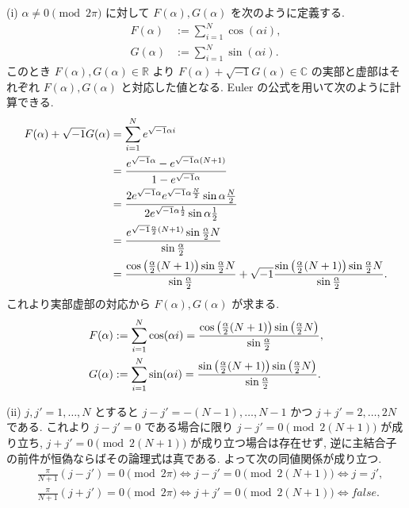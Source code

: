 \documentclass[uplatex,dvipdfmx,a4paper,11pt]{jlreq}
\theoremstyle{definition}
\newcommand{\RR}{\mathbb{R}}
\newcommand{\CC}{\mathbb{C}}
\begin{document}
(i) $\alpha \neq 0 \pmod{2\pi}$ に対して $F(\alpha), G(\alpha)$ を次のように定義する.
\begin{align}
  F(\alpha) & := \sum_{i=1}^{N}\cos(\alpha i), \\
  G(\alpha) & := \sum_{i=1}^{N}\sin(\alpha i).
\end{align}
このとき $F(\alpha), G(\alpha)\in\RR$ より $F(\alpha) + \sqrt{-1}G(\alpha)\in\CC$ の実部と虚部はそれぞれ $F(\alpha), G(\alpha)$ と対応した値となる. Euler の公式を用いて次のように計算できる.
\begin{align}
  F(\alpha) + \sqrt{-1}G(\alpha) & = \sum_{i=1}^{N}e^{\sqrt{-1}\alpha i}                                                                                                                                                     \\
                                 & = \frac{e^{\sqrt{-1}\alpha} - e^{\sqrt{-1}\alpha (N+1)}}{1 - e^{\sqrt{-1}\alpha}}                                                                                                         \\
                                 & = \frac{2e^{\sqrt{-1}\alpha}e^{\sqrt{-1}\alpha \frac{N}{2}}\sin{\alpha \frac{N}{2}}}{2e^{\sqrt{-1}\alpha\frac{1}{2}}\sin{\alpha\frac{1}{2}}}                                              \\
                                 & = \frac{e^{\sqrt{-1}\frac{\alpha}{2}(N+1)}\sin{\frac{\alpha}{2}N}}{\sin{\frac{\alpha}{2}}}                                                                                                \\
                                 & = \frac{\cos\qty(\frac{\alpha}{2}(N+1))\sin{\frac{\alpha}{2}N}}{\sin{\frac{\alpha}{2}}} + \sqrt{-1}\frac{\sin\qty(\frac{\alpha}{2}(N+1))\sin{\frac{\alpha}{2}N}}{\sin{\frac{\alpha}{2}}}.
\end{align}
これより実部虚部の対応から $F(\alpha), G(\alpha)$ が求まる.
\begin{align}
  F(\alpha) & := \sum_{i=1}^{N}\cos(\alpha i) = \frac{\cos\qty(\frac{\alpha}{2}(N+1))\sin\qty(\frac{\alpha}{2}N)}{\sin{\frac{\alpha}{2}}}, \\
  G(\alpha) & := \sum_{i=1}^{N}\sin(\alpha i) = \frac{\sin\qty(\frac{\alpha}{2}(N+1))\sin\qty(\frac{\alpha}{2}N)}{\sin{\frac{\alpha}{2}}}.
\end{align}

(ii) $j, j' = 1,\ldots,N$ とすると $j - j' = -(N - 1),\ldots,N - 1$ かつ $j + j' = 2,\ldots,2N$ である. これより $j - j' = 0$ である場合に限り $j - j' = 0 \pmod{2(N+1)}$ が成り立ち, $j + j' = 0 \pmod{2(N+1)}$ が成り立つ場合は存在せず, 逆に主結合子の前件が恒偽ならばその論理式は真である. よって次の同値関係が成り立つ.
\begin{align}
   & \frac{\pi}{N+1}(j - j') = 0 \pmod{2\pi} \iff j - j' = 0 \pmod{2(N+1)} \iff j = j', \label{Q17-3. ii-1} \\
   & \frac{\pi}{N+1}(j + j') = 0 \pmod{2\pi} \iff j + j' = 0 \pmod{2(N+1)} \iff false. \label{Q17-3. ii-2}
\end{align}
\end{document}
